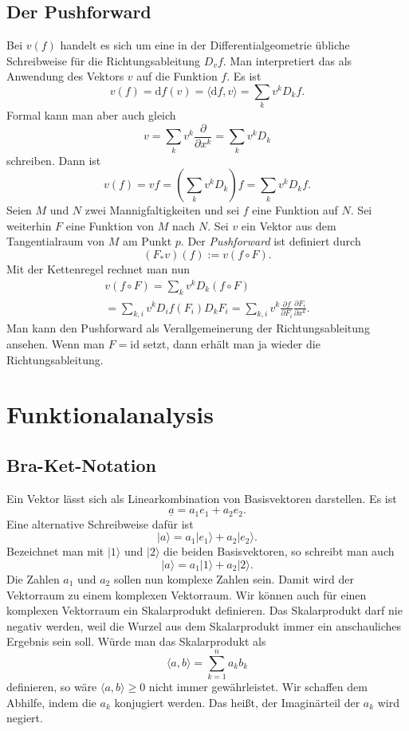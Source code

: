 \documentclass[a4paper,10pt,fleqn,twocolumn,twoside]{article}
\begin{document}
\subsection{Der Pushforward}

Bei $v(f)$ handelt es sich um eine in der Differentialgeometrie
übliche Schreibweise für die Richtungsableitung $D_v f$. Man
interpretiert das als Anwendung des Vektors $v$ auf die Funktion
$f$. Es ist
\[v(f) = \mathrm df(v) = \langle\mathrm df,v\rangle
= \sum_k v^k D_k f.\]
Formal kann man aber auch gleich
\[v=\sum_k v^k\frac{\partial}{\partial x^k} = \sum_k v^k D_k\]
schreiben. Dann ist
\[v(f) = vf = (\sum_k v^k D_k)f = \sum_k v^k D_k f.\]
%
Seien $M$ und $N$ zwei Mannigfaltigkeiten und sei $f$ eine
Funktion auf $N$. Sei weiterhin $F$ eine Funktion von $M$ nach
$N$. Sei $v$ ein Vektor aus dem Tangentialraum von $M$ am Punkt
$p$. Der \textit{Pushforward} ist definiert durch
\[(F_\ast v)(f) := v(f\circ F).\]
Mit der Kettenregel rechnet man nun
\begin{gather*}
v(f\circ F) = \sum_k v^k D_k(f\circ F)\\
= \sum_{k,i} v^k D_i f(F_i)D_k F_i
= \sum_{k,i} v^k \frac{\partial f}{\partial F_i}
\frac{\partial F_i}{\partial x^k}.
\end{gather*}
Man kann den Pushforward als Verallgemeinerung der Richtungsableitung
ansehen. Wenn man $F=\mathrm{id}$ setzt, dann erhält man ja wieder
die Richtungsableitung.



\section{Funktionalanalysis}

\subsection{Bra-Ket-Notation}

Ein Vektor lässt sich als Linearkombination von Basisvektoren
darstellen. Es ist
\[\underline a = a_1e_1+a_2e_2.\]
Eine alternative Schreibweise dafür ist
\[|a\rangle = a_1|e_1\rangle+a_2|e_2\rangle.\]
Bezeichnet man mit $|1\rangle$ und $|2\rangle$ die beiden
Basisvektoren, so schreibt man auch
\[|a\rangle = a_1|1\rangle+a_2|2\rangle.\]
Die Zahlen $a_1$ und $a_2$ sollen nun komplexe Zahlen sein.
Damit wird der Vektorraum zu einem komplexen Vektorraum. Wir können
auch für einen komplexen Vektorraum ein Skalarprodukt definieren.
Das Skalarprodukt darf nie negativ werden, weil die Wurzel aus dem
Skalarprodukt immer ein anschauliches Ergebnis sein soll. Würde man
das Skalarprodukt als
\[\langle a,b\rangle = \sum_{k=1}^n a_kb_k\]
definieren, so wäre $\langle a,b\rangle\geq 0$ nicht immer
gewährleistet. Wir schaffen dem Abhilfe, indem die $a_k$ konjugiert
werden. Das heißt, der Imaginärteil der $a_k$ wird negiert.
\end{document}
